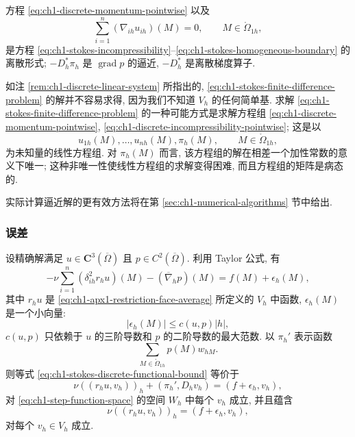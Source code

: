 方程 \eqref{eq:ch1-discrete-momentum-pointwise} 以及
\begin{equation}
\sum_{i=1}^n(\nabla_{ih}u_{ih})(M)=0,
\qquad M\in\mathring\Omega_{1h},
\label{eq:ch1-discrete-incompressibility-pointwise}
\end{equation}
是方程 \eqref{eq:ch1-stokes-incompressibility}--\eqref{eq:ch1-stokes-homogeneous-boundary} 的离散形式; $-D_h^\ast\pi_h$ 是 $\operatorname{grad}p$ 的逼近, $-D_h^\ast$ 是离散梯度算子.

\begin{Remark}
\label{rem:ch1-discrete-stokes-solver}
如注 \ref{rem:ch1-discrete-linear-system} 所指出的, \eqref{eq:ch1-stokes-finite-difference-problem} 的解并不容易求得, 因为我们不知道 $V_h$ 的任何简单基. 求解 \eqref{eq:ch1-stokes-finite-difference-problem} 的一种可能方式是求解方程组 \eqref{eq:ch1-discrete-momentum-pointwise}, \eqref{eq:ch1-discrete-incompressibility-pointwise}; 这是以
\[
u_{1h}(M),\ldots,u_{nh}(M),\pi_h(M),
\qquad M\in\mathring\Omega_{1h},
\]
为未知量的线性方程组. 对 $\pi_h(M)$ 而言, 该方程组的解在相差一个加性常数的意义下唯一; 这种非唯一性使线性方程组的求解变得困难, 而且方程组的矩阵是病态的.

实际计算逼近解的更有效方法将在第 \ref{sec:ch1-numerical-algorithms} 节中给出.
\end{Remark}

\subsubsection*{误差}

设精确解满足 $u\in\mathbf C^3(\overline\Omega)$ 且 $p\in C^2(\overline\Omega)$. 利用 Taylor 公式, 有
\begin{equation}
-\nu\sum_{i=1}^n(\delta_{ih}^2r_hu)(M)
-(\overline\nabla_hp)(M)
=f(M)+\epsilon_h(M),
\label{eq:ch1-discrete-consistency-residual}
\end{equation}
其中 $r_hu$ 是 \eqref{eq:ch1-apx1-restriction-face-average} 所定义的 $V_h$ 中函数, $\epsilon_h(M)$ 是一个小向量:
\begin{equation}
|\epsilon_h(M)|\leq c(u,p)|h|,
\label{eq:ch1-discrete-residual-bound}
\end{equation}
$c(u,p)$ 只依赖于 $u$ 的三阶导数和 $p$ 的二阶导数的最大范数. 以 $\pi_h'$ 表示函数
\[
\sum_{M\in\mathring\Omega_{1h}}p(M)w_{hM}.
\]
则等式 \eqref{eq:ch1-stokes-discrete-functional-bound} 等价于
\begin{equation}
\nu((r_hu,v_h))_h+(\pi_h',D_hv_h)
=(f+\epsilon_h,v_h),
\label{eq:ch1-consistency-weak-all-wh}
\end{equation}
对 \eqref{eq:ch1-step-function-space} 的空间 $W_h$ 中每个 $v_h$ 成立, 并且蕴含
\begin{equation}
\nu((r_hu,v_h))_h=(f+\epsilon_h,v_h),
\label{eq:ch1-consistency-weak-vh}
\end{equation}
对每个 $v_h\in V_h$ 成立.

